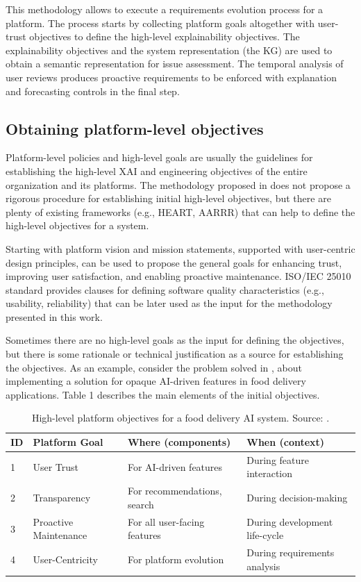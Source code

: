 \documentclass[preprint,10pt]{elsarticle}
\begin{document}
This methodology allows to execute a requirements evolution process for a platform. The process starts by collecting platform goals altogether with user-trust objectives to define the high-level explainability objectives. The explainability objectives and the system representation (the KG) are used to obtain a semantic representation for issue assessment. The temporal analysis of user reviews produces proactive requirements to be enforced with explanation and forecasting controls in the final step.

\subsection{Obtaining platform-level objectives}

Platform-level policies and high-level goals are usually the guidelines for establishing the high-level XAI and engineering objectives of the entire organization and its platforms. The methodology proposed in  does not propose a rigorous procedure for establishing initial high-level objectives, but there are plenty of existing frameworks (e.g., HEART, AARRR) that can help to define the high-level objectives for a system.

Starting with platform vision and mission statements, supported with user-centric design principles, can be used to propose the general goals for enhancing trust, improving user satisfaction, and enabling proactive maintenance. ISO/IEC 25010 standard provides clauses for defining software quality characteristics (e.g., usability, reliability) that can be later used as the input for the methodology presented in this work.

Sometimes there are no high-level goals as the input for defining the objectives, but there is some rationale or technical justification as a source for establishing the objectives. As an example, consider the problem solved in , about implementing a solution for opaque AI-driven features in food delivery applications. Table 1 describes the main elements of the initial objectives.

\begin{table}[h!]
    \caption{High-level platform objectives for a food delivery AI system. Source: .}
    \label{tab:1}
    \centering
    \begin{tabular}{llll}
        \toprule
        \textbf{ID} & \textbf{Platform Goal} & \textbf{Where (components)} & \textbf{When (context)} \\
        \midrule
        1 & User Trust & For AI-driven features & During feature interaction \\
        2 & Transparency & For recommendations, search & During decision-making \\
        3 & Proactive Maintenance & For all user-facing features & During development life-cycle \\
        4 & User-Centricity & For platform evolution & During requirements analysis \\
        \bottomrule
    \end{tabular}
\end{table}
\end{document}
